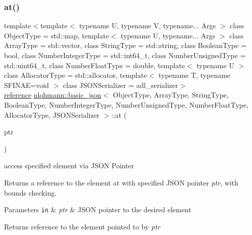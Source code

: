 \subsubsection{\texorpdfstring{at()}{at()}\hspace{0.1cm}{\footnotesize\ttfamily [5/6]}}
{\footnotesize\ttfamily template$<$template$<$ typename U, typename V, typename... Args $>$ class Object\+Type = std\+::map, template$<$ typename U, typename... Args $>$ class Array\+Type = std\+::vector, class String\+Type  = std\+::string, class Boolean\+Type  = bool, class Number\+Integer\+Type  = std\+::int64\+\_\+t, class Number\+Unsigned\+Type  = std\+::uint64\+\_\+t, class Number\+Float\+Type  = double, template$<$ typename U $>$ class Allocator\+Type = std\+::allocator, template$<$ typename T, typename S\+F\+I\+N\+A\+E=void $>$ class J\+S\+O\+N\+Serializer = adl\+\_\+serializer$>$ \\
\mbox{\hyperlink{classnlohmann_1_1basic__json_ac6a5eddd156c776ac75ff54cfe54a5bc}{reference}} \mbox{\hyperlink{classnlohmann_1_1basic__json}{nlohmann\+::basic\+\_\+json}}$<$ Object\+Type, Array\+Type, String\+Type, Boolean\+Type, Number\+Integer\+Type, Number\+Unsigned\+Type, Number\+Float\+Type, Allocator\+Type, J\+S\+O\+N\+Serializer $>$\+::at (\begin{DoxyParamCaption}\item[{const \mbox{\hyperlink{classnlohmann_1_1json__pointer}{json\+\_\+pointer}} \&}]{ptr }\end{DoxyParamCaption})\hspace{0.3cm}{\ttfamily [inline]}}



access specified element via J\+S\+ON Pointer 

Returns a reference to the element at with specified J\+S\+ON pointer {\itshape ptr}, with bounds checking.


\begin{DoxyParams}[1]{Parameters}
\mbox{\tt in}  & {\em ptr} & J\+S\+ON pointer to the desired element\\
\hline
\end{DoxyParams}
\begin{DoxyReturn}{Returns}
reference to the element pointed to by {\itshape ptr} 
\end{DoxyReturn}

